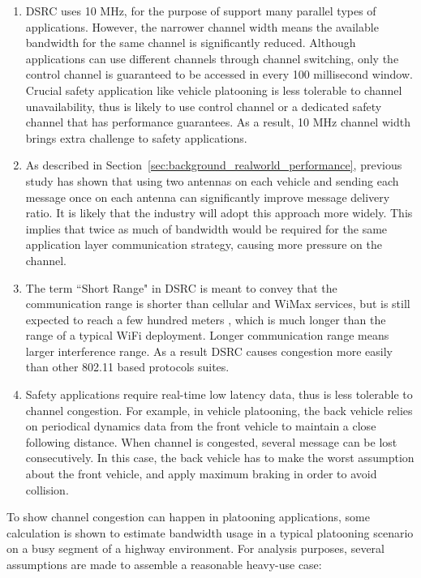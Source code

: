 \documentclass[12pt]{report}
\begin{document}
\begin{enumerate}
  \item DSRC uses 10 MHz, for the purpose of support many parallel types of applications. However, the narrower channel width means the available bandwidth for the same channel is significantly reduced. Although applications can use different channels through channel switching, only the control channel is guaranteed to be accessed in every 100 millisecond window. Crucial safety application like vehicle platooning is less tolerable to channel unavailability, thus is likely to use control channel or a dedicated safety channel that has performance guarantees. As a result, 10 MHz channel width brings extra challenge to safety applications.
  \item As described in Section~\ref{sec:background_realworld_performance}, previous study \cite{songDSRC2016} has shown that using two antennas on each vehicle and sending each message once on each antenna can significantly improve message delivery ratio. It is likely that the industry will adopt this approach more widely. This implies that twice as much of bandwidth would be required for the same application layer communication strategy, causing more pressure on the channel.
  \item The term ``Short Range" in DSRC is meant to convey that the communication range is shorter than cellular and WiMax services, but is still expected to reach a few hundred meters \cite{kenney2011}, which is much longer than the range of a typical WiFi deployment. Longer communication range means larger interference range. As a result DSRC causes congestion more easily than other 802.11 based protocols suites.
  \item Safety applications require real-time low latency data, thus is less tolerable to channel congestion. For example, in vehicle platooning, the back vehicle relies on periodical dynamics data from the front vehicle to maintain a close following distance. When channel is congested, several message can be lost consecutively. In this case, the back vehicle has to make the worst assumption about the front vehicle, and apply maximum braking in order to avoid collision.
\end{enumerate}

To show channel congestion can happen in platooning applications, some calculation is shown to estimate bandwidth usage in a typical platooning scenario on a busy segment of a highway environment. For analysis purposes, several assumptions are made to assemble a reasonable heavy-use case:
\end{document}
